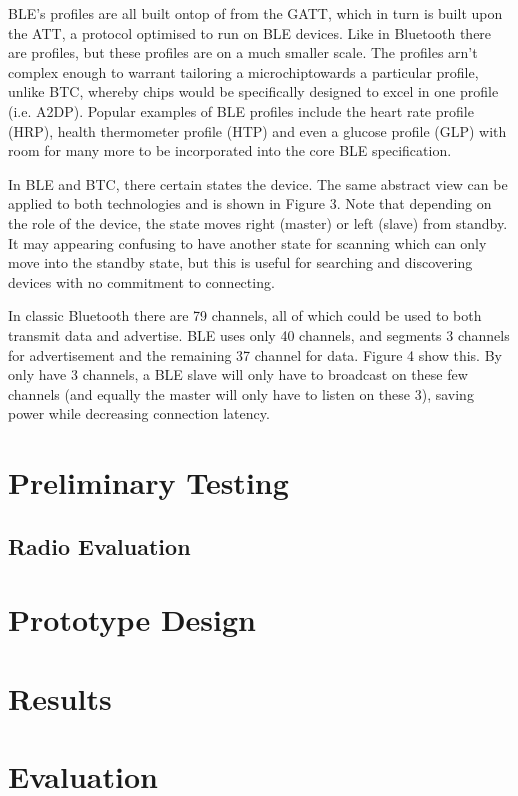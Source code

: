 \documentclass[]{article}
\begin{document}
\ac{BLE}'s profiles are all built ontop of from the \ac{GATT}, which in turn is built upon the \ac{ATT}, a protocol optimised to run on BLE devices. Like in Bluetooth there are profiles, but these profiles are on a much smaller scale. The profiles arn't complex enough to warrant tailoring a microchiptowards a particular profile, unlike \ac{BTC}, whereby chips would be specifically designed to excel in one profile (i.e. A2DP). Popular examples of \ac{BLE} profiles include the heart rate profile (HRP), health thermometer profile (HTP) and even a glucose profile (GLP) with room for many more to be incorporated into the core \ac{BLE} specification. 

In BLE and BTC, there certain states the device. The same abstract view can be applied to both technologies and is shown in Figure 3. Note that depending on the role of the device, the state moves right (master) or left (slave) from standby. It may appearing confusing to have another state for scanning which can only move into the standby state, but this is useful for searching and discovering devices with no commitment to connecting. 



In classic Bluetooth there are 79 channels, all of which could be used to both transmit data and advertise. BLE uses only 40 channels, and segments 3 channels for advertisement and the remaining 37 channel for data. Figure 4 show this. By only have 3 channels, a BLE slave will only have to broadcast on these few channels (and equally the master will only have to listen on these 3), saving power while decreasing connection latency. 

\section{Preliminary Testing}
\subsection{Radio Evaluation}

\section{Prototype Design}

\section{Results}

\section{Evaluation}
\end{document}
